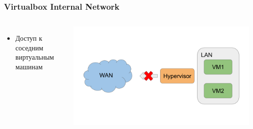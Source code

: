 \begin{frame}
\frametitle{Virtualbox Internal Network}
	\begin{columns}
        \begin{itemize}
            \item Доступ к соседним виртуальным машинам
        \end{itemize}
    \includegraphics[height=0.4\textheight]{../../slides/vbox/Virtualbox network Internal.png}
	\end{columns}
\end{frame}